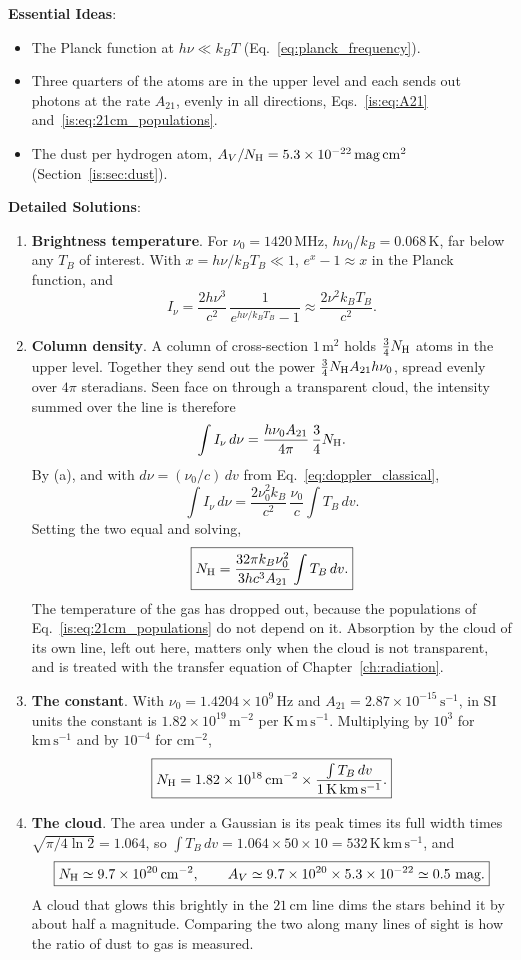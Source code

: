 \textbf{Essential Ideas}:
\begin{itemize}
	\item The Planck function at $h\nu\ll k_BT$ (Eq.~\eqref{eq:planck_frequency}).
	\item Three quarters of the atoms are in the upper level and each sends out photons at the rate $A_{21}$, evenly in all directions, Eqs.~\eqref{is:eq:A21} and~\eqref{is:eq:21cm_populations}.
	\item The dust per hydrogen atom, $A_V/N_{\rm H}=5.3\times10^{-22}\,\mathrm{mag\,cm^2}$ (Section~\ref{is:sec:dust}).
\end{itemize}

\textbf{Detailed Solutions}:
\begin{enumerate}[label=(\alph*)]
	\item \textbf{Brightness temperature}. For $\nu_0=1420\,\mathrm{MHz}$, $h\nu_0/k_B=0.068\,\mathrm K$, far below any $T_B$ of interest. With $x=h\nu/k_BT_B\ll1$, $e^x-1\approx x$ in the Planck function, and
	\[
	\boxed{I_\nu=\frac{2h\nu^3}{c^2}\,\frac{1}{e^{h\nu/k_BT_B}-1}\approx\frac{2\nu^2k_BT_B}{c^2}.}
	\]
	\item \textbf{Column density}. A column of cross-section $1\,\mathrm{m^2}$ holds $\tfrac34N_{\rm H}$ atoms in the upper level. Together they send out the power $\tfrac34N_{\rm H}A_{21}h\nu_0$, spread evenly over $4\pi$ steradians. Seen face on through a transparent cloud, the intensity summed over the line is therefore
	\[
	\int I_\nu\,d\nu=\frac{h\nu_0A_{21}}{4\pi}\,\frac34N_{\rm H}.
	\]
	By (a), and with $d\nu=(\nu_0/c)\,dv$ from Eq.~\eqref{eq:doppler_classical},
	\[
	\int I_\nu\,d\nu=\frac{2\nu_0^2k_B}{c^2}\,\frac{\nu_0}{c}\int T_B\,dv .
	\]
	Setting the two equal and solving,
	\[
	\boxed{N_{\rm H}=\frac{32\pi k_B\nu_0^2}{3hc^3A_{21}}\int T_B\,dv.}
	\]
	The temperature of the gas has dropped out, because the populations of Eq.~\eqref{is:eq:21cm_populations} do not depend on it. Absorption by the cloud of its own line, left out here, matters only when the cloud is not transparent, and is treated with the transfer equation of Chapter~\ref{ch:radiation}.
	\item \textbf{The constant}. With $\nu_0=1.4204\times10^9\,\mathrm{Hz}$ and $A_{21}=2.87\times10^{-15}\,\mathrm{s^{-1}}$, in SI units the constant is $1.82\times10^{19}\,\mathrm{m^{-2}}$ per $\mathrm{K\,m\,s^{-1}}$. Multiplying by $10^3$ for $\mathrm{km\,s^{-1}}$ and by $10^{-4}$ for $\mathrm{cm^{-2}}$,
	\[
	\boxed{N_{\rm H}=1.82\times10^{18}\,\mathrm{cm^{-2}}\times\frac{\int T_B\,dv}{1\,\mathrm{K\,km\,s^{-1}}}.}
	\]
	\item \textbf{The cloud}. The area under a Gaussian is its peak times its full width times $\sqrt{\pi/4\ln2}=1.064$, so $\int T_B\,dv=1.064\times50\times10=532\,\mathrm{K\,km\,s^{-1}}$, and
	\[
	\boxed{N_{\rm H}\simeq9.7\times10^{20}\,\mathrm{cm^{-2}},\qquad A_V\simeq9.7\times10^{20}\times5.3\times10^{-22}\simeq0.5\ \text{mag}.}
	\]
	A cloud that glows this brightly in the $21\,\mathrm{cm}$ line dims the stars behind it by about half a magnitude. Comparing the two along many lines of sight is how the ratio of dust to gas is measured.
\end{enumerate}

